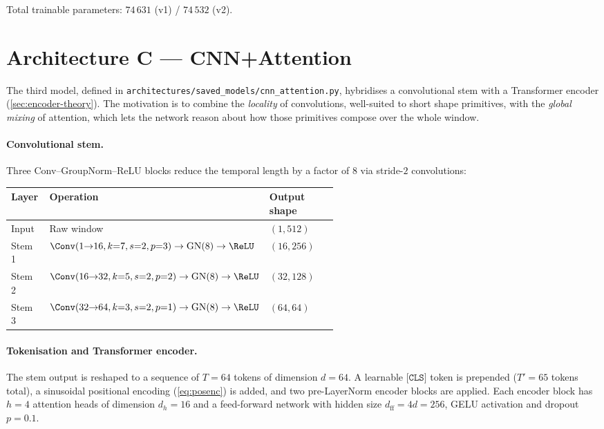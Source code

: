 Total trainable parameters: $74\,631$ (v1) / $74\,532$ (v2).

\section{Architecture C --- CNN+Attention}
\label{sec:archi-attn}

The third model, defined in
\texttt{architectures/saved\_models/cnn\_attention.py}, hybridises a
convolutional stem with a Transformer encoder
(\cref{sec:encoder-theory}). The motivation is to combine the
\emph{locality} of convolutions, well-suited to short shape primitives,
with the \emph{global mixing} of attention, which lets the network
reason about how those primitives compose over the whole window.

\paragraph{Convolutional stem.}
Three Conv--GroupNorm--ReLU blocks reduce the temporal length by a
factor of $8$ via stride-$2$ convolutions:

\begin{table}[H]
    \centering
    \footnotesize
    \begin{tabular}{@{}l p{0.55\linewidth} l@{}}
        \toprule
        \textbf{Layer} & \textbf{Operation} & \textbf{Output shape} \\
        \midrule
        Input  & Raw window                                                                  & $(1, 512)$ \\
        Stem 1 & $\Conv(1{\to}16, k{=}7, s{=}2, p{=}3) \to \mathrm{GN}(8) \to \ReLU$           & $(16, 256)$ \\
        Stem 2 & $\Conv(16{\to}32, k{=}5, s{=}2, p{=}2) \to \mathrm{GN}(8) \to \ReLU$          & $(32, 128)$ \\
        Stem 3 & $\Conv(32{\to}64, k{=}3, s{=}2, p{=}1) \to \mathrm{GN}(8) \to \ReLU$          & $(64, 64)$ \\
        \bottomrule
    \end{tabular}
\end{table}

\paragraph{Tokenisation and Transformer encoder.}
The stem output is reshaped to a sequence of $T = 64$ tokens of
dimension $d = 64$. A learnable $\texttt{[CLS]}$ token is prepended
($T' = 65$ tokens total), a sinusoidal positional encoding
(\cref{eq:posenc}) is added, and two pre-LayerNorm encoder blocks are
applied. Each encoder block has $h = 4$ attention heads of dimension
$d_h = 16$ and a feed-forward network with hidden size
$d_{\mathrm{ff}} = 4 d = 256$, GELU activation and dropout $p = 0.1$.

